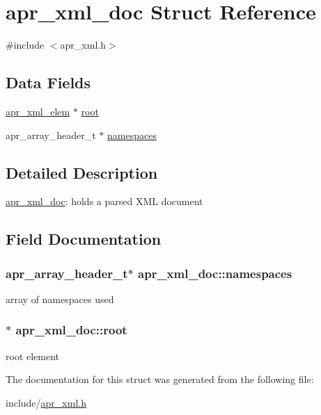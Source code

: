 \hypertarget{structapr__xml__doc}{\section{apr\-\_\-xml\-\_\-doc Struct Reference}
\label{structapr__xml__doc}
}


{\ttfamily \#include $<$apr\-\_\-xml.\-h$>$}

\subsection*{Data Fields}
\begin{DoxyCompactItemize}
\item 
\hyperlink{structapr__xml__elem}{apr\-\_\-xml\-\_\-elem} $\ast$ \hyperlink{structapr__xml__doc_a9385ccf062ed6997d2d59d80cda28a71}{root}
\item 
apr\-\_\-array\-\_\-header\-\_\-t $\ast$ \hyperlink{structapr__xml__doc_a6aee4d0e4516c9b8191ad734c2748d39}{namespaces}
\end{DoxyCompactItemize}


\subsection{Detailed Description}
\hyperlink{structapr__xml__doc}{apr\-\_\-xml\-\_\-doc}\-: holds a parsed X\-M\-L document 

\subsection{Field Documentation}
\hypertarget{structapr__xml__doc_a6aee4d0e4516c9b8191ad734c2748d39}{
\subsubsection[{namespaces}]{\setlength{\rightskip}{0pt plus 5cm}apr\-\_\-array\-\_\-header\-\_\-t$\ast$ apr\-\_\-xml\-\_\-doc\-::namespaces}}\label{structapr__xml__doc_a6aee4d0e4516c9b8191ad734c2748d39}
array of namespaces used \hypertarget{structapr__xml__doc_a9385ccf062ed6997d2d59d80cda28a71}{
\subsubsection[{root}]{$\ast$ apr\-\_\-xml\-\_\-doc\-::root}}\label{structapr__xml__doc_a9385ccf062ed6997d2d59d80cda28a71}
root element 

The documentation for this struct was generated from the following file\-:\begin{DoxyCompactItemize}
\item 
include/\hyperlink{apr__xml_8h}{apr\-\_\-xml.\-h}\end{DoxyCompactItemize}
